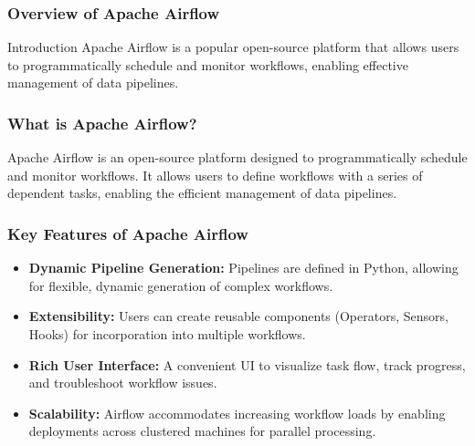 \documentclass[aspectratio=169]{beamer}
\begin{document}
\begin{frame}[fragile]
    \frametitle{Overview of Apache Airflow}
    \begin{block}{Introduction}
        Apache Airflow is a popular open-source platform that allows users to programmatically schedule and monitor workflows, enabling effective management of data pipelines.
    \end{block}
\end{frame}

\begin{frame}[fragile]
    \frametitle{What is Apache Airflow?}
    Apache Airflow is an open-source platform designed to programmatically schedule and monitor workflows. It allows users to define workflows with a series of dependent tasks, enabling the efficient management of data pipelines.
\end{frame}

\begin{frame}[fragile]
    \frametitle{Key Features of Apache Airflow}
    \begin{itemize}
        \item \textbf{Dynamic Pipeline Generation:} Pipelines are defined in Python, allowing for flexible, dynamic generation of complex workflows.
        \item \textbf{Extensibility:} Users can create reusable components (Operators, Sensors, Hooks) for incorporation into multiple workflows.
        \item \textbf{Rich User Interface:} A convenient UI to visualize task flow, track progress, and troubleshoot workflow issues.
        \item \textbf{Scalability:} Airflow accommodates increasing workflow loads by enabling deployments across clustered machines for parallel processing.
    \end{itemize}
\end{frame}
\end{document}
